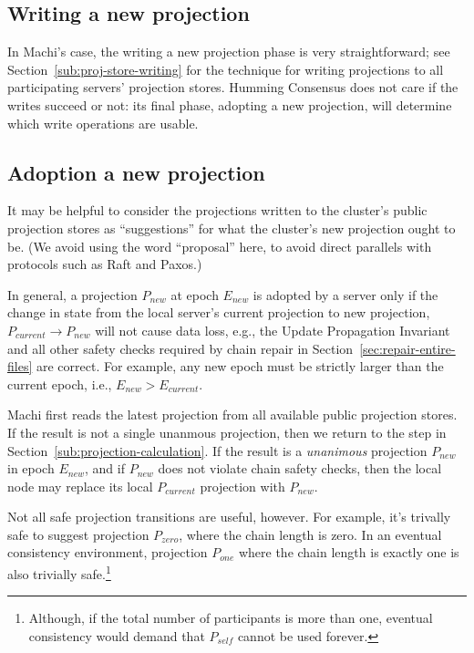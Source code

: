 \documentclass[preprint,10pt]{sigplanconf}
\begin{document}
\subsection{Writing a new projection}
\label{sub:proj-storage-writing}

In Machi's case, the writing a new projection phase is very
straightforward; see
Section~\ref{sub:proj-store-writing} for the technique for writing
projections to all participating servers' projection stores.
Humming Consensus does not care
if the writes succeed or not: its final phase, adopting a
new projection, will determine which write operations are usable.

\subsection{Adoption a new projection}
\label{sub:proj-adoption}

It may be helpful to consider the projections written to the cluster's
public projection stores as ``suggestions'' for what the cluster's new
projection ought to be.  (We avoid using the word ``proposal'' here,
to avoid direct parallels with protocols such as Raft and Paxos.)

In general, a projection $P_{new}$ at epoch $E_{new}$ is adopted by a
server only if
the change in state from the local server's current projection to new
projection, $P_{current} \rightarrow P_{new}$ will not cause data loss,
e.g., the Update Propagation Invariant and all other safety checks
required by chain repair in Section~\ref{sec:repair-entire-files}
are correct. For example, any new epoch must be strictly larger than
the current epoch, i.e., $E_{new} > E_{current}$.

Machi first reads the latest projection from all
available public projection stores.  If the result is not a single
unanmous projection, then we return to the step in
Section~\ref{sub:projection-calculation}.  If the result is a {\em
  unanimous} projection $P_{new}$ in epoch $E_{new}$, and if $P_{new}$
does not violate chain safety checks, then the local node may
replace its local $P_{current}$ projection with $P_{new}$.

Not all safe projection transitions are useful, however.  For example,
it's trivally safe to suggest projection $P_{zero}$, where the chain
length is zero.  In an eventual consistency environment, projection
$P_{one}$ where the chain length is exactly one is also trivially
safe.\footnote{Although, if the total number of participants is more
  than one, eventual consistency would demand that $P_{self}$ cannot
  be used forever.}
\end{document}
